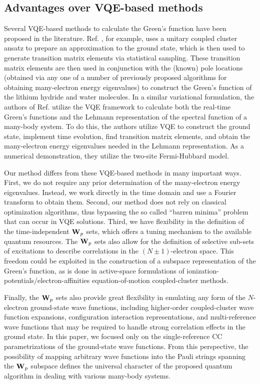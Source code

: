 \documentclass[aip,reprint,table,xcdraw,usenames,dvipsnames]{revtex4-1}
\begin{document}
\subsection*{Advantages over VQE-based methods}
Several VQE-based methods to calculate the Green's function have been proposed in the literature. Ref. , for example, uses a unitary coupled cluster ansatz to prepare an approximation to the ground state, which is then used to generate transition matrix elements via statistical sampling. These transition matrix elements are then used in conjunction with the (known) pole locations (obtained via any one of a number of previously proposed algorithms for obtaining many-electron energy eigenvalues) to construct the Green's function of the lithium hydride and water molecules. In a similar variational formulation, the authors of Ref.  utilize the VQE framework to calculate both the real-time Green's functions and the Lehmann representation of the spectral function of a many-body system. To do this, the authors utilize VQE to construct the ground state, implement time evolution, find transition matrix elements, and obtain the many-electron energy eigenvalues needed in the Lehmann representation. As a numerical demonstration, they utilize the two-site Fermi-Hubbard model.


Our method differs from these VQE-based methods in many important ways. First, we do not require any prior determination of the many-electron energy eigenvalues. Instead, we work directly in the time domain and use a Fourier transform to obtain them. Second, our method does not rely on classical optimization algorithms, thus bypassing the so called ``barren minima'' problem that can occur in VQE solutions. Third, we have flexibility in the definition of the time-independent ${\bf W}_p$ sets, which offers a tuning mechanism to the available quantum resources. The ${\bf W}_p$ sets also allow for the definition of selective sub-sets of excitations to describe correlations in the $(N \pm 1)$-electron space. This freedom could be exploited in the construction of a subspace representation of the Green's function, as is done in active-space formulations of ionization-potentials/electron-affinities equation-of-motion coupled-cluster methods.

Finally, the ${\bf W}_p$ sets also provide great flexibility in emulating any form of the $N$-electron ground-state wave functions, including higher-order coupled-cluster wave function expansions, configuration interaction representations, and multi-reference wave functions that may be required to handle strong correlation effects in the ground state. In this paper, we focused only on the single-reference CC parametrizations of the ground-state wave functions. From this perspective, the possibility of mapping arbitrary wave functions into the Pauli strings spanning the ${\bf W}_p$ subspace defines the universal character of the proposed quantum algorithm in dealing with various many-body systems.  
\end{document}
